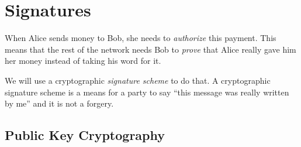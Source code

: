 %
%
%
\section{Signatures}

When Alice sends money to Bob, she needs to \emph{authorize} this payment. This means
that the rest of the network needs Bob to \emph{prove} that Alice really gave him
her money instead of taking his word for it.

We will use a cryptographic \emph{signature scheme} to do that. A cryptographic signature
scheme is a means for a party to say ``this message was really written by me'' and it is
not a forgery.

\subsection*{Public Key Cryptography}

